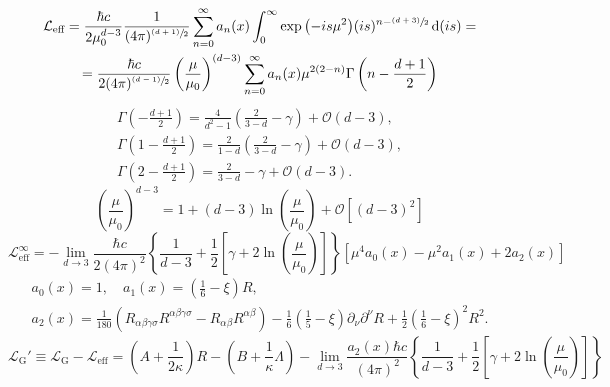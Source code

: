 \begin{multline}
	\mathcal{L}_{\text{eff}}=\frac{\hbar c}{2\mu_0^{d-3}}\frac{1}{(4\pi)^{\sfrac{(d+1)}{2}}}\sum_{n=0}^\infty a_n(x)\int^\infty_0\exp{\left(-is\mu^2\right)}(is)^{n-\sfrac{(d+3)}{2}}\,\text{d} (is)=\\
	=\frac{\hbar c}{2(4\pi)^{\sfrac{(d-1)}{2}}}\left(\frac{\mu}{\mu_0}\right)^{(d-3)}\sum_{n=0}^{\infty}a_n(x)\mu^{2(2-n)}\Gamma\left(n-\frac{d+1}{2}\right)
\end{multline}
\begin{subequations}
	\begin{gather}
		\Gamma\left(-\frac{d+1}{2}\right)=\frac{4}{d^2-1}\left(\frac{2}{3-d}-\gamma\right)+\mathcal{O}(d-3),\\
		\Gamma\left(1-\frac{d+1}{2}\right)=\frac{2}{1-d}\left(\frac{2}{3-d}-\gamma\right)+\mathcal{O}(d-3),\\
		\Gamma\left(2-\frac{d+1}{2}\right)=\frac{2}{3-d}-\gamma+\mathcal{O}(d-3).
	\end{gather}
\end{subequations}
\begin{equation}
	\left(\frac{\mu}{\mu_0}\right)^{d-3}=1+(d-3)\ln\left(\frac{\mu}{\mu_0}\right)+\mathcal{O}\left[(d-3)^2\right]
\end{equation}
\begin{equation}
	\mathcal{L}_{\text{eff}}^\infty=-\lim\limits_{d\to 3}\frac{\hbar c}{2(4\pi)^2}\left\{\frac{1}{d-3}+\frac{1}{2}\left[\gamma+2\ln\left(\frac{\mu}{\mu_0}\right)\right]\right\}\left[\mu^4a_0(x)-\mu^2a_1(x)+2a_2(x)\right]
\end{equation}
\begin{subequations}
	\begin{gather}
		a_0(x)=1,\quad a_1(x)=\left(\frac{1}{6}-\xi\right)R,\tag{\theequation \,\,a,b}\\
		a_2(x)=\frac{1}{180}\left(R_{\alpha\beta\gamma\sigma}R^{\alpha\beta\gamma\sigma}-R_{\alpha\beta}R^{\alpha\beta}\right)-\frac{1}{6}\left(\frac{1}{5}-\xi\right)\partial_\nu\partial^\nu R+\frac{1}{2}\left(\frac{1}{6}-\xi\right)^2R^2.\tag{\theequation \,\,c}
	\end{gather}
\end{subequations}
\begin{equation}
	\mathcal{L}_{\text{G}}'\equiv\mathcal{L}_{\text{G}}-\mathcal{L}_{\text{eff}}=\left(A+\frac{1}{2\kappa}\right)R-\left(B+\frac{1}{\kappa}\Lambda\right)-\lim\limits_{d\to 3}\frac{a_2(x)\hbar c}{(4\pi)^2}\left\{\frac{1}{d-3}+\frac{1}{2}\left[\gamma+2\ln\left(\frac{\mu}{\mu_0}\right)\right]\right\}
\end{equation}
